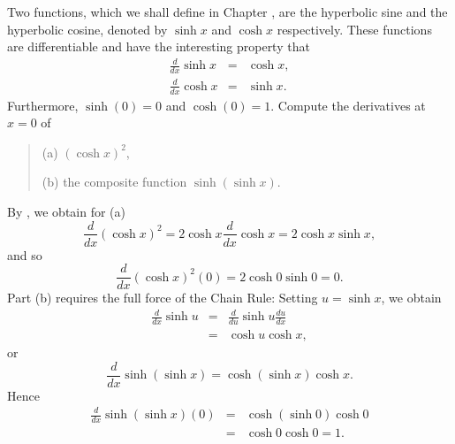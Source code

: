 \begin{example}
\label{exam 1.8.6}
Two functions,
which we shall define in Chapter ,
are the hyperbolic sine and the hyperbolic cosine,
denoted by $\sinh x$ and $\cosh x$ respectively.
These functions are differentiable and have the interesting property that
\begin{eqnarray*}
\frac{d}{dx} \sinh x  &=& \cosh x, \\
\frac{d}{dx} \cosh x &=& \sinh x.
\end{eqnarray*}
Furthermore, $\sinh (0) = 0$ and $\cosh (0) = 1$.
Compute the derivatives at $x= 0$ of
\begin{quote}
(a) $(\cosh x)^2$,

(b) the composite function $\sinh (\sinh x)$. 
\end{quote}
By ,
we obtain for (a)
$$
\frac{d}{dx}(\cosh x)^2 = 2 \cosh x \frac{d}{dx} \cosh x = 2 \cosh x \sinh x,
$$
and so 
$$
\frac{d}{dx} {(\cosh x)^2}(0) = 2 \cosh 0 \sinh 0 = 0.
$$
Part (b) requires the full force of the Chain Rule:
Setting $u = \sinh x$, we obtain
\begin{eqnarray*}
\frac{d}{dx} \sinh u
&=& \frac{d}{du} \sinh u \frac{du}{dx}  \\
&=& \cosh u \cosh x, 
\end{eqnarray*}
or
\[
\frac{d}{dx} \sinh (\sinh x) = \cosh (\sinh x) \cosh x.
\]
Hence
\begin{eqnarray*}
\frac{d}{dx} \sinh (\sinh x)(0)
&=& \cosh (\sinh 0) \cosh 0   \\
&=& \cosh 0 \cosh 0 = 1.
\end{eqnarray*}
\end{example}
